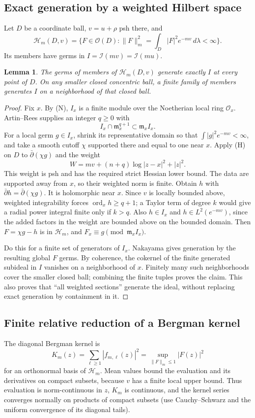 \documentclass[11pt]{article}
\newcommand{\I}{\mathcal I}
\newcommand{\OO}{\mathcal O}
\newcommand{\ord}{\operatorname{ord}}
\newtheorem{lemma}[theorem]{Lemma}
\theoremstyle{definition}
\begin{document}
\subsection{Exact generation by a weighted Hilbert space}
Let $D$ be a coordinate ball, $v=u+\rho$ psh there, and
\[
 \mathcal H_m(D,v)=\{F\in\OO(D):
          \|F\|_m^2=\int_D|F|^2e^{-mv}\,d\lambda<\infty\}.
\]
Its members have germs in $I=\I(mv)=\I(mu)$.
\begin{lemma}\label{lem:generate}
The germs of members of $\mathcal H_m(D,v)$ generate exactly $I$
at every point of $D$. On any smaller closed concentric ball,
a finite family of members generates $I$ on a neighborhood of that
closed ball.
\end{lemma}
\begin{proof}
Fix $x$. By (N), $I_x$ is a finite module over the Noetherian local
ring $\OO_x$. Artin--Rees supplies an integer $q\geq0$ with
\[
 I_x\cap\mathfrak m_x^{q+1}\subset\mathfrak m_x I_x.
\]
For a local germ $g\in I_x$, shrink its representative domain so
that $\int|g|^2e^{-mv}<\infty$, and take a smooth cutoff $\chi$
supported there and equal to one near $x$. Apply (H) on $D$ to
$\bar\partial(\chi g)$ and the weight
\[
 W=mv+(n+q)\log|z-x|^2+|z|^2.
\]
This weight is psh and has the required strict Hessian lower bound.
The data are supported away from $x$, so their weighted norm is
finite. Obtain $h$ with $\bar\partial h=\bar\partial(\chi g)$.
It is holomorphic near $x$. Since $v$ is locally bounded above,
weighted integrability forces $\ord_xh\geq q+1$; a Taylor term of
degree $k$ would give a radial power integral finite only if
$k>q$. Also $h\in I_x$ and $h\in L^2(e^{-mv})$, since the added
factors in the weight are bounded above on the bounded domain.
Then $F=\chi g-h$ is in $\mathcal H_m$, and
$F_x\equiv g\pmod{\mathfrak m_xI_x}$.

Do this for a finite set of generators of $I_x$. Nakayama gives
generation by the resulting global $F$ germs. By coherence, the
cokernel of the finite generated subideal in $I$ vanishes on a
neighborhood of $x$. Finitely many such neighborhoods cover the
smaller closed ball; combining the finite tuples proves the claim.
This also proves that ``all weighted sections'' generate the ideal,
without replacing exact generation by containment in it.
\end{proof}

\subsection{Finite relative reduction of a Bergman kernel}
The diagonal Bergman kernel is
\[
 K_m(z)=\sum_{\ell\geq1}|f_{m,\ell}(z)|^2
       =\sup_{\|F\|_m\leq1}|F(z)|^2
\]
for an orthonormal basis of $\mathcal H_m$. Mean values bound the
evaluation and its derivatives on compact subsets, because $v$
has a finite local upper bound. Thus evaluation is norm-continuous
in $z$, $K_m$ is continuous, and the kernel series converges
normally on products of compact subsets (use Cauchy--Schwarz and
the uniform convergence of its diagonal tails).
\end{document}
